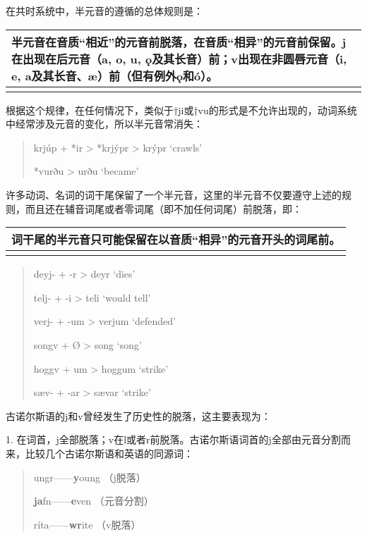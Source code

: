 在共时系统中，半元音的遵循的总体规则是：

\begin{longtable}{l}
\toprule
半元音在音质``相近''的元音前脱落，在音质``相异''的元音前保留。j在出现在后元音（a, o, u, ǫ及其长音）前；v出现在非圆唇元音（i, e, a及其长音、æ）前（但有例外ǫ和ó）。 \\
\midrule
\endhead
\bottomrule
\endfoot
\end{longtable}

根据这个规律，在任何情况下，类似于†ji或†vu的形式是不允许出现的，动词系统中经常涉及元音的变化，所以半元音常消失：

\begin{quote}
krjúp + *ir \textgreater{} *krjýpr \textgreater{} krýpr `crawls'

*vurðu \textgreater{} urðu `became'
\end{quote}

许多动词、名词的词干尾保留了一个半元音，这里的半元音不仅要遵守上述的规则，而且还在辅音词尾或者零词尾（即不加任何词尾）前脱落，即：

\begin{longtable}{l}
\toprule
词干尾的半元音只可能保留在以音质``相异''的元音开头的词尾前。 \\
\midrule
\endhead
\bottomrule
\endfoot
\end{longtable}

\begin{quote}
deyj- + -r \textgreater{} deyr `dies'

telj- + -i \textgreater{} teli `would tell'

verj- + -um \textgreater{} verjum `defended'

songv + Ø \textgreater{} song `song'

hoggv + um \textgreater{} hoggum `strike'

sæv- + -ar \textgreater{} sævar `strike'
\end{quote}

古诺尔斯语的j和v曾经发生了历史性的脱落，这主要表现为：

1.
在词首，j全部脱落；v在l或者r前脱落。古诺尔斯语词首的j全部由元音分割而来，比较几个古诺尔斯语和英语的同源词：

\begin{quote}
ungr------\textbf{y}oung （j脱落）

\textbf{ja}fn------\textbf{e}ven （元音分割）

ríta------\textbf{wr}ite （v脱落）
\end{quote}

